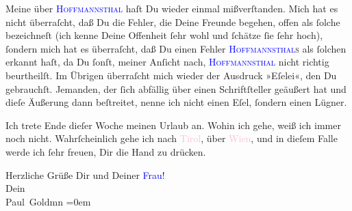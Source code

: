 \pstart
           {\pb}Meine \label{K_L03449-8v}\label{K_L03449-8h} über \textsc{\textcolor{blue}{Hoffmannsthal}{}\ledrightnote{\textcolor{blue}{Hugo von Hofmannsthal}}} haſt Du wieder einmal mißverſtanden. Mich hat es nicht überraſcht, daß Du die
               Fehler, die Deine Freunde begehen, offen als ſolche bezeichneſt (ich kenne Deine
               Offenheit ſehr wohl und ſchätze ſie ſehr hoch), ſondern mich hat es überraſcht, daß
               Du einen Fehler \textsc{\textcolor{blue}{Hoffmannsthal}{}\ledrightnote{\textcolor{blue}{Hugo von Hofmannsthal}}s} als ſolchen erkannt
               haſt, da Du ſonſt, meiner Anſicht nach, \textsc{\textcolor{blue}{Hoffmannsthal}{}\ledrightnote{\textcolor{blue}{Hugo von Hofmannsthal}}}{ }{\pb}nicht richtig beurtheilſt. Im Übrigen überraſcht
               mich wieder der Ausdruck »Eſelei«, den Du gebrauchſt. Jemanden, der ſich abfällig
               über einen Schriftſteller geäußert hat und dieſe Äußerung dann beſtreitet,  nenne ich nicht einen Eſel, ſondern einen
               Lügner.\pend
           
\pstart
           Ich trete Ende dieſer Woche meinen Urlaub an. Wohin ich gehe, weiß {\pb}ich immer noch nicht.  Wahrſcheinlich gehe ich nach \textcolor{pink}{Tirol}{}\ledrightnote{\textcolor{pink}{Tirol}},
               über \textcolor{pink}{Wien}{}\ledrightnote{\textcolor{pink}{Wien}}, und in dieſem Falle werde ich ſehr
               freuen, Dir \label{K_L03449-9v}\label{K_L03449-9h} die Hand zu drücken.\pend
           
\pstart
           Herzliche Grüße Dir und Deiner \textcolor{blue}{Frau}{}\ledrightnote{{$\rightarrow$}\textcolor{blue}{Olga Schnitzler}}! {\\[\baselineskip]}Dein {\\[\baselineskip]}\spacefill\mbox{Paul Goldmn}\pend
           \leftskip=0em{}\endnumbering{}
\begin{anhang}
\end{anhang}
      